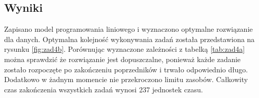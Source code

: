 \documentclass{article}
\begin{document}
\subsection{Wyniki}
Zapisano model programowania liniowego i wyznaczono optymalne rozwiązanie dla danych.
Optymalna kolejność wykonywania zadań została przedstawiona na rysunku \ref{fig:zad4b}.
Porównując wyznaczone zależności z tabelką \ref{tab:zad4a} można sprawdzić że rozwiązanie jest dopuszczalne, ponieważ każde zadanie zostało rozpoczęte po zakończeniu poprzedników i trwało odpowiednio długo. 
Dodatkowo w żadnym momencie nie przekroczono limitu zasobów. Całkowity czas zakończenia wszystkich zadań wynosi 237 jednostek czasu.
\end{document}
